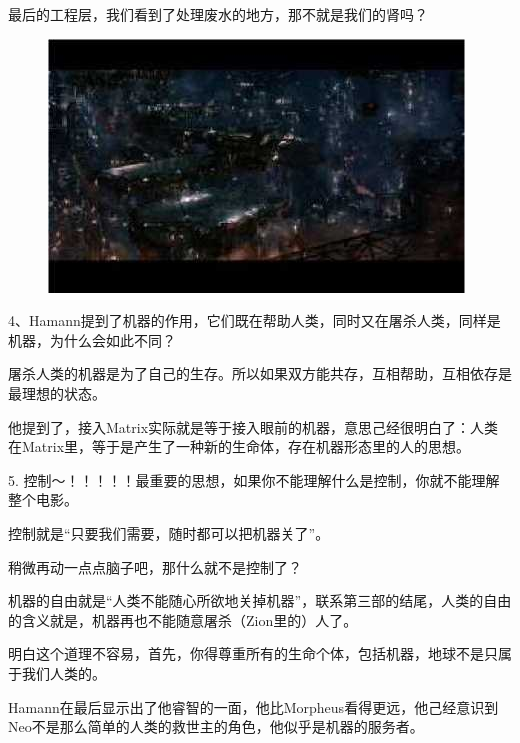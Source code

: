 \documentclass[UTF8]{ctexart}
\begin{document}
最后的工程层，我们看到了处理废水的地方，那不就是我们的肾吗？

\begin{figure}[htb]
\centering
\includegraphics[width=0.5\linewidth]{fig/read_reloaded-52}
\end{figure}

4、Hamann提到了机器的作用，它们既在帮助人类，同时又在屠杀人类，同样是机器，为什么会如此不同？

屠杀人类的机器是为了自己的生存。所以如果双方能共存，互相帮助，互相依存是最理想的状态。

他提到了，接入Matrix实际就是等于接入眼前的机器，意思己经很明白了：人类在Matrix里，等于是产生了一种新的生命体，存在机器形态里的人的思想。

5. 控制～！！！！！最重要的思想，如果你不能理解什么是控制，你就不能理解整个电影。

控制就是“只要我们需要，随时都可以把机器关了”。

稍微再动一点点脑子吧，那什么就不是控制了？

机器的自由就是“人类不能随心所欲地关掉机器”，联系第三部的结尾，人类的自由的含义就是，机器再也不能随意屠杀（Zion里的）人了。

明白这个道理不容易，首先，你得尊重所有的生命个体，包括机器，地球不是只属于我们人类的。

Hamann在最后显示出了他睿智的一面，他比Morpheus看得更远，他己经意识到Neo不是那么简单的人类的救世主的角色，他似乎是机器的服务者。
\end{document}
